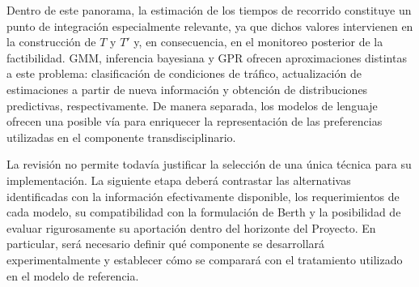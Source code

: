 \documentclass[11pt]{article}
\begin{document}
Dentro de este panorama, la estimación de los tiempos de recorrido constituye un punto
de integración especialmente relevante, ya que dichos valores intervienen en la
construcción de \(T\) y \(T'\) y, en consecuencia, en el monitoreo posterior de la
factibilidad. GMM, inferencia bayesiana y GPR ofrecen aproximaciones distintas a este
problema: clasificación de condiciones de tráfico, actualización de estimaciones a partir
de nueva información y obtención de distribuciones predictivas, respectivamente. De
manera separada, los modelos de lenguaje ofrecen una posible vía para enriquecer la
representación de las preferencias utilizadas en el componente transdisciplinario.

La revisión no permite todavía justificar la selección de una única técnica para su
implementación. La siguiente etapa deberá contrastar las alternativas identificadas
con la información efectivamente disponible, los requerimientos de cada modelo, su
compatibilidad con la formulación de Berth y la posibilidad de evaluar rigurosamente
su aportación dentro del horizonte del Proyecto. En particular, será necesario definir
qué componente se desarrollará experimentalmente y establecer cómo se comparará con
el tratamiento utilizado en el modelo de referencia.

\printbibliography
\end{document}
